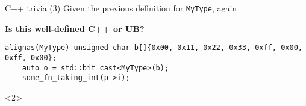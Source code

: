 \begin{frame}[fragile]{C++ trivia (3)}
  Given the previous definition for \texttt{MyType}, again
  \vfill

  \textbf{Is this well-defined C++ or UB?}
  \begin{lstlisting}[style=c++]
    alignas(MyType) unsigned char b[]{0x00, 0x11, 0x22, 0x33, 0xff, 0x00, 0xff, 0x00};
    auto o = std::bit_cast<MyType>(b);
    some_fn_taking_int(p->i);
  \end{lstlisting}

  \begin{onlyenv}<2>
  \end{onlyenv}
\end{frame}
